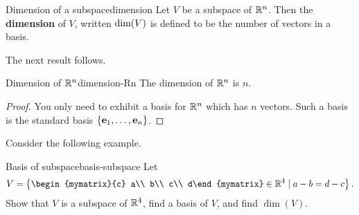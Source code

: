 \begin{definition}{Dimension of a subspace}{dimension}
  Let $V$ be a subspace of $\mathbb{R}^{n}$. Then the \textbf{dimension }of
  $V$, written $\mbox{\rm dim}(V)$ is defined to be the number of vectors
  in a basis.
\end{definition}

The next result follows.

\begin{corollary}{Dimension of $\mathbb{R}^n$}{dimension-Rn}
  The dimension of $\mathbb{R}^{n}$ is $n$.
\end{corollary}

\begin{proof}
  You only need to exhibit a basis for $\mathbb{R}^{n}$ which has $n$
  vectors. Such a basis is the standard basis
  $\left\{\mbox{\bf e}_{1},\ldots , \mbox{\bf e}_{n}\right\}$.
\end{proof}

Consider the following example.

\begin{example}{Basis of subspace}{basis-subspace}
  Let 
  \begin{equation*}
    V=\set{
      \begin{mymatrix}{c} a\\ b\\ c\\ d\end{mymatrix}\in\R^4 \mid
      a-b=d-c
    }.
  \end{equation*}
  Show that $V$ is a subspace of $\mathbb{R}^4$, find a basis of $V$, and find
  $\dim(V)$.
\end{example}

